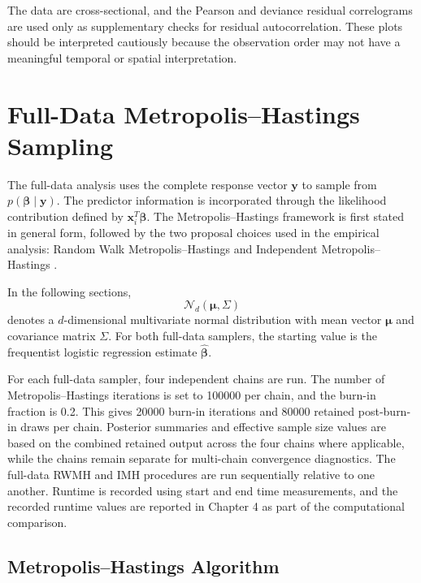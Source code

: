 The data are cross-sectional, and the Pearson and deviance residual correlograms are used only as supplementary checks for residual autocorrelation. These plots should be interpreted cautiously because the observation order may not have a meaningful temporal or spatial interpretation.

\section{Full-Data Metropolis--Hastings Sampling}

The full-data analysis uses the complete response vector $\mathbf{y}$ to sample from $p(\boldsymbol{\beta}\mid \mathbf{y})$. The predictor information is incorporated through the likelihood contribution defined by $\mathbf{x}_i^T\boldsymbol{\beta}$. The Metropolis--Hastings framework is first stated in general form, followed by the two proposal choices used in the empirical analysis: Random Walk Metropolis--Hastings and Independent Metropolis--Hastings \cite{metropolis1953equation,hastings1970monte,chib1995understanding}.

In the following sections,
\[
\mathcal{N}_d(\boldsymbol{\mu},\Sigma)
\]
denotes a $d$-dimensional multivariate normal distribution with mean vector $\boldsymbol{\mu}$ and covariance matrix $\Sigma$. For both full-data samplers, the starting value is the frequentist logistic regression estimate $\widehat{\boldsymbol{\beta}}$.

For each full-data sampler, four independent chains are run. The number of Metropolis--Hastings iterations is set to 100000 per chain, and the burn-in fraction is 0.2. This gives 20000 burn-in iterations and 80000 retained post-burn-in draws per chain. Posterior summaries and effective sample size values are based on the combined retained output across the four chains where applicable, while the chains remain separate for multi-chain convergence diagnostics. The full-data RWMH and IMH procedures are run sequentially relative to one another. Runtime is recorded using start and end time measurements, and the recorded runtime values are reported in Chapter 4 as part of the computational comparison.

\subsection{Metropolis--Hastings Algorithm}

